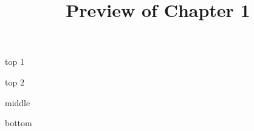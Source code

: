 \documentclass{ximera}
\title{Preview of Chapter 1}
\begin{document}
\begin{abstract}
\end{abstract}

\maketitle



top 1


top 2

\begin{expandable}

\begin{center}
\end{center}

\end{expandable}



middle


\begin{expandable}

\begin{center}
\end{center}

\end{expandable}





bottom
\end{document}

